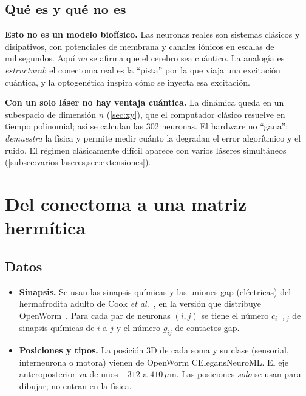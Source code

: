 \documentclass[11pt,a4paper]{article}
\theoremstyle{plain}
\theoremstyle{definition}
\theoremstyle{remark}
\begin{document}
\subsection{Qué es y qué no es}

\begin{honestidad}
\textbf{Esto no es un modelo biofísico.} Las neuronas reales son sistemas clásicos y disipativos, con potenciales de membrana y canales iónicos en escalas de milisegundos. Aquí \emph{no} se afirma que el cerebro sea cuántico. La analogía es \emph{estructural}: el conectoma real es la ``pista'' por la que viaja una excitación cuántica, y la optogenética inspira cómo se inyecta esa excitación.

\textbf{Con un solo láser no hay ventaja cuántica.} La dinámica queda en un subespacio de dimensión $n$ (\cref{sec:xy}), que el computador clásico resuelve en tiempo polinomial; así se calculan las 302 neuronas. El hardware no ``gana'': \emph{demuestra} la física y permite medir cuánto la degradan el error algorítmico y el ruido. El régimen clásicamente difícil aparece con varios láseres simultáneos (\cref{subsec:varios-laseres,sec:extensiones}).
\end{honestidad}

\section{Del conectoma a una matriz hermítica}
\label{sec:conectoma}

\subsection{Datos}

\begin{itemize}
\item \textbf{Sinapsis.} Se usan las sinapsis químicas y las uniones gap (eléctricas) del hermafrodita adulto de Cook \emph{et al.}~\cite{cook2019}, en la versión que distribuye OpenWorm~\cite{openworm}. Para cada par de neuronas $(i,j)$ se tiene el número $c_{i\to j}$ de sinapsis químicas de $i$ a $j$ y el número $g_{ij}$ de contactos gap.
\item \textbf{Posiciones y tipos.} La posición 3D de cada soma y su clase (sensorial, interneurona o motora) vienen de OpenWorm CElegansNeuroML. El eje anteroposterior va de unos $-312$ a $410\,\mu$m. Las posiciones \emph{solo} se usan para dibujar; no entran en la física.
\end{itemize}
\end{document}
